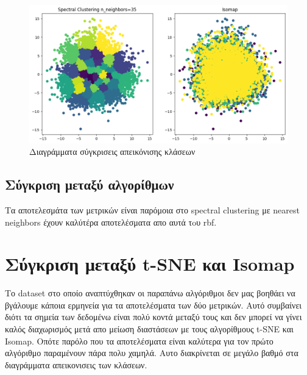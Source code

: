 		\begin{figure}[ht]
			\centering
			\includegraphics[width=1\linewidth]{Imagedata1/n_35isomap1.png}
			\caption{ Διαγράμματα σύγκρισεις απεικόνισης κλάσεων }
			\label{f:g18}	
		\end{figure}
		
\clearpage	
		
		\subsection{Σύγκριση μεταξύ αλγορίθμων}
		Τα αποτελεσμάτα των μετρικών είναι παρόμοια στο spectral clustering με nearest neighbors έχουν καλύτέρα αποτελέσματα απο αυτά τoυ rbf.
		
\section{Σύγκριση μεταξύ t-SNE και Isomap}

Το dataset στο οποίο αναπτύχθηκαν οι παραπάνω αλγόριθμοι δεν μας βοηθάει να βγάλουμε κάποια ερμηνεία για τα αποτελέσματα των δύο μετρικών. Αυτό συμβαίνει διότι τα σημεία των δεδομένω είναι πολύ κοντά μεταξύ τους και δεν μπορεί να γίνει καλός διαχωρισμός μετά απο μείωση διαστάσεων με τους αλγορίθμους t-SNE και Isomap. Οπότε παρόλο που τα αποτελέσματα είναι καλύτερα για τον πρώτο αλγόριθμο παραμένουν πάρα πολυ χαμηλά. Αυτο διακρίνεται σε μεγάλο βαθμό στα διαγράμματα απεικονισεις των κλάσεων.